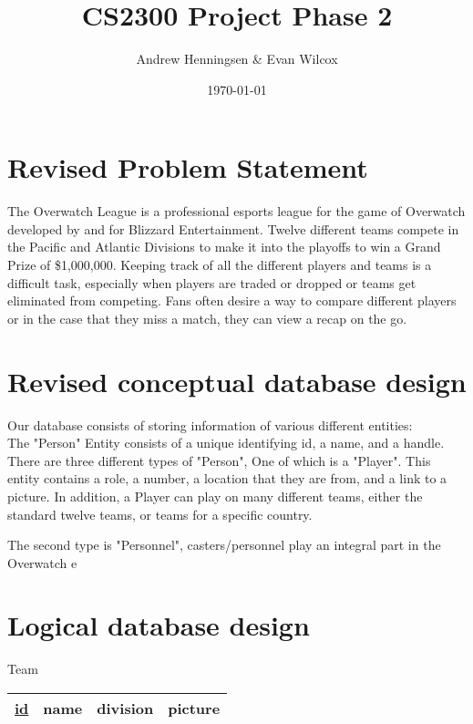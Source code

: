 \documentclass[a4paper]{article}
\title{CS2300 Project Phase 2}
\author{Andrew Henningsen \& Evan Wilcox}
\date{\today}
\begin{document}
    \maketitle
    
    \section{Revised Problem Statement}
    The Overwatch League is a professional esports league for the game of Overwatch developed by and for Blizzard Entertainment.
    Twelve different teams compete in the Pacific and Atlantic Divisions to make it into the playoffs to win a Grand Prize of \$1,000,000.
    Keeping track of all the different players and teams is a difficult task, especially when players are traded or dropped or teams get eliminated 
    from competing. Fans often desire a way to compare different players or in the case that they miss a match, they can view a recap on the go.
    \section{Revised conceptual database design}
    Our database consists of storing information of various different entities: \\

    The "Person" Entity consists of a unique identifying id, a name, and a handle. \\

    There are three different types of "Person", One of which is a "Player". This entity contains a role, a number, a location that they are from,
    and a link to a picture. In addition, a Player can play on many different teams, either the standard twelve teams, or teams for a specific country.    
    
    The second type is "Personnel", casters/personnel play an integral part in the Overwatch e
    \section{Logical database design}

    Team\\
    \begin{tabular}{ |c|c|c|c| }
        \hline
        \underline{id} & name & division & picture\\
        \hline
    \end{tabular}

    \vspace{0.5cm}
\end{document}
